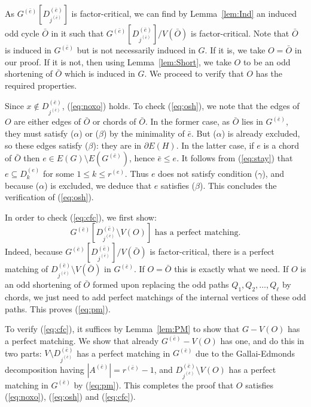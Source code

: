 \documentclass[10pt,a4paper]{amsart}
\begin{document}
As $G^{(\bar{e})}[D_{j^{(\bar{e})}}^{(\bar{e})}]$ is factor-critical, we can find by Lemma~\ref{lem:Ind} an induced odd cycle $\bar{O}$ in it such that $G^{(\bar{e})}[D_{j^{(\bar{e})}}^{(\bar{e})}]/V(\bar{O})$ is factor-critical. Note that $\bar{O}$ is induced in $G^{(\bar{e})}$ but is not necessarily induced in $G$. If it is, we take $O = \bar{O}$ in our proof. If it is not, then using Lemma~\ref{lem:Short}, we take $O$ to be an odd shortening of $\bar{O}$ which is induced in $G$. We proceed to verify that $O$ has the required properties.

Since $x \notin D_{j^{(\bar{e})}}^{(\bar{e})}$, (\ref{eq:noxo}) holds. To check (\ref{eq:osh}), we note that the edges of $O$ are either edges of $\bar{O}$ or chords of $\bar{O}$. In the former case, as $\bar{O}$ lies in $G^{(\bar{e})}$, they must satisfy ($\alpha$) or ($\beta$) by the minimality of $\bar{e}$. But ($\alpha$) is already excluded, so these edges satisfy ($\beta$): they are in $\partial E(H)$. In the latter case, if $e$ is a chord of $\bar{O}$ then $e \in E(G) \setminus E(G^{(\bar{e})})$, hence $\bar{e} \le e$. It follows from (\ref{eq:stay}) that $e \subseteq D_k^{(e)}$ for some $1 \le k \le r^{(e)}$. Thus $e$ does not satisfy condition ($\gamma$), and because ($\alpha$) is excluded, we deduce that $e$ satisfies ($\beta$). This concludes the verification of (\ref{eq:osh}).

In order to check (\ref{eq:cfc}), we first show:
\begin{equation} \label{eq:pm}
G^{(\bar{e})}[D_{j^{(\bar{e})}}^{(\bar{e})} \setminus V(O)] \textrm{ has a perfect matching}.
\end{equation}
Indeed, because $G^{(\bar{e})}[D_{j^{(\bar{e})}}^{(\bar{e})}]/V(\bar{O})$ is factor-critical, there is a perfect matching of $D_{j^{(\bar{e})}}^{(\bar{e})} \setminus V(\bar{O})$ in $G^{(\bar{e})}$. If $O = \bar{O}$ this is exactly what we need. If $O$ is an odd shortening of $\bar{O}$ formed upon replacing the odd paths $Q_1, Q_2, \ldots , Q_{\ell}$ by chords, we just need to add perfect matchings of the internal vertices of these odd paths. This proves (\ref{eq:pm}).

To verify (\ref{eq:cfc}), it suffices by Lemma~\ref{lem:PM} to show that $G - V(O)$ has a perfect matching. We show that already $G^{(\bar{e})} - V(O)$ has one, and do this in two parts: $V \setminus D_{j^{(\bar{e})}}^{(\bar{e})}$ has a perfect matching in $G^{(\bar{e})}$ due to the Gallai-Edmonds decomposition having $|A^{(\bar{e})}| = r^{(\bar{e})} - 1$, and $D_{j^{(\bar{e})}}^{(\bar{e})} \setminus V(O)$ has a perfect matching in $G^{(\bar{e})}$ by (\ref{eq:pm}). This completes the proof that $O$ satisfies (\ref{eq:noxo}), (\ref{eq:osh}) and (\ref{eq:cfc}).
\end{document}
